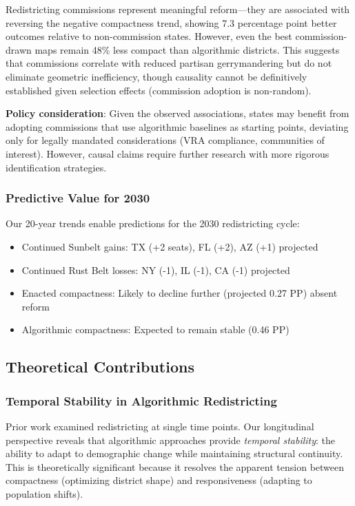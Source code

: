 Redistricting commissions represent meaningful reform—they are associated with reversing the negative compactness trend, showing 7.3 percentage point better outcomes relative to non-commission states. However, even the best commission-drawn maps remain 48\% less compact than algorithmic districts. This suggests that commissions correlate with reduced partisan gerrymandering but do not eliminate geometric inefficiency, though causality cannot be definitively established given selection effects (commission adoption is non-random).

\textbf{Policy consideration}: Given the observed associations, states may benefit from adopting commissions that use algorithmic baselines as starting points, deviating only for legally mandated considerations (VRA compliance, communities of interest). However, causal claims require further research with more rigorous identification strategies.

\subsubsection{Predictive Value for 2030}

Our 20-year trends enable predictions for the 2030 redistricting cycle:
\begin{itemize}
    \item Continued Sunbelt gains: TX (+2 seats), FL (+2), AZ (+1) projected
    \item Continued Rust Belt losses: NY (-1), IL (-1), CA (-1) projected
    \item Enacted compactness: Likely to decline further (projected 0.27 PP) absent reform
    \item Algorithmic compactness: Expected to remain stable (0.46 PP)
\end{itemize}

\subsection{Theoretical Contributions}

\subsubsection{Temporal Stability in Algorithmic Redistricting}

Prior work examined redistricting at single time points. Our longitudinal perspective reveals that algorithmic approaches provide \textit{temporal stability}: the ability to adapt to demographic change while maintaining structural continuity. This is theoretically significant because it resolves the apparent tension between compactness (optimizing district shape) and responsiveness (adapting to population shifts).

